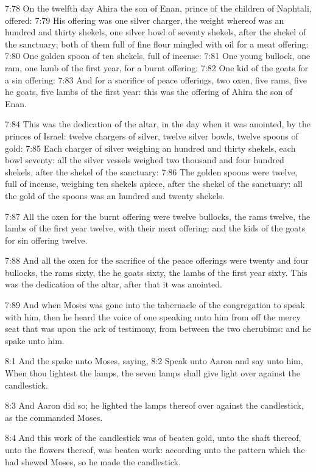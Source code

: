 7:78 On the twelfth day Ahira the son of Enan, prince of the children of Naphtali, offered: 7:79 His offering was one silver charger, the weight whereof was an hundred and thirty shekels, one silver bowl of seventy shekels, after the shekel of the sanctuary; both of them full of fine flour mingled with oil for a meat offering: 7:80 One golden spoon of ten shekels, full of incense: 7:81 One young bullock, one ram, one lamb of the first year, for a burnt offering: 7:82 One kid of the goats for a sin offering: 7:83 And for a sacrifice of peace offerings, two oxen, five rams, five he goats, five lambs of the first year: this was the offering of Ahira the son of Enan.

7:84 This was the dedication of the altar, in the day when it was anointed, by the princes of Israel: twelve chargers of silver, twelve silver bowls, twelve spoons of gold: 7:85 Each charger of silver weighing an hundred and thirty shekels, each bowl seventy: all the silver vessels weighed two thousand and four hundred shekels, after the shekel of the sanctuary: 7:86 The golden spoons were twelve, full of incense, weighing ten shekels apiece, after the shekel of the sanctuary: all the gold of the spoons was an hundred and twenty shekels.

7:87 All the oxen for the burnt offering were twelve bullocks, the rams twelve, the lambs of the first year twelve, with their meat offering: and the kids of the goats for sin offering twelve.

7:88 And all the oxen for the sacrifice of the peace offerings were twenty and four bullocks, the rams sixty, the he goats sixty, the lambs of the first year sixty. This was the dedication of the altar, after that it was anointed.

7:89 And when Moses was gone into the tabernacle of the congregation to speak with him, then he heard the voice of one speaking unto him from off the mercy seat that was upon the ark of testimony, from between the two cherubims: and he spake unto him.

8:1 And the \LORD spake unto Moses, saying, 8:2 Speak unto Aaron and say unto him, When thou lightest the lamps, the seven lamps shall give light over against the candlestick.

8:3 And Aaron did so; he lighted the lamps thereof over against the candlestick, as the \LORD commanded Moses.

8:4 And this work of the candlestick was of beaten gold, unto the shaft thereof, unto the flowers thereof, was beaten work: according unto the pattern which the \LORD had shewed Moses, so he made the candlestick.


